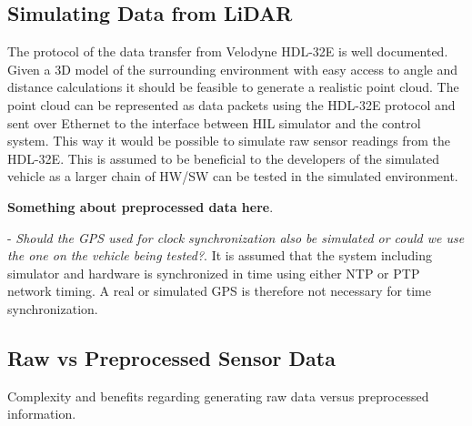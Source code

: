 \subsection{Simulating Data from LiDAR}
The protocol of the data transfer from Velodyne HDL-32E is well documented. Given a 3D model of the surrounding environment with easy access to angle and distance calculations it should be feasible to generate a realistic point cloud. The point cloud can be represented as data packets using the HDL-32E protocol and sent over Ethernet to the interface between HIL simulator and the control system. This way it would be possible to simulate raw sensor readings from the HDL-32E. This is assumed to be beneficial to the developers of the simulated vehicle as a larger chain of HW/SW can be tested in the simulated environment.	

\textbf{Something about preprocessed data here}.

- \textit{Should the GPS used for clock synchronization also be simulated or could we use the one on the vehicle being tested?}. It is assumed that the system including simulator and hardware is synchronized in time using either NTP or PTP network timing. A real or simulated GPS is therefore not necessary for time synchronization.



\subsection{Raw vs Preprocessed Sensor Data}
Complexity and benefits regarding generating raw data versus preprocessed information.







